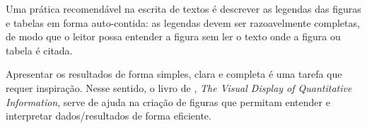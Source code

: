 Uma prática recomendável na escrita de textos é descrever as legendas das
figuras e tabelas em forma auto-contida: as legendas devem ser razoavelmente
completas, de modo que o leitor possa entender a figura sem ler o texto onde a
figura ou tabela é citada.

Apresentar os resultados de forma simples, clara e completa é uma tarefa que
requer inspiração. Nesse sentido, o livro de \citet{tufte01:visualDisplay},
\emph{The Visual Display of Quantitative Information}, serve de ajuda na
criação de figuras que permitam entender e interpretar dados/resultados de forma
eficiente.

